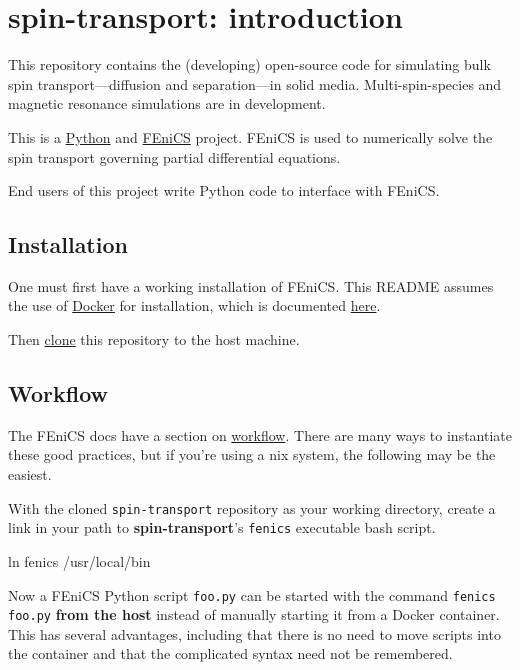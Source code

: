 \documentclass[%
oneside,                 %
final,                   %
10pt]{article}
\begin{document}
\section{spin-transport: introduction}

This repository contains the (developing) open-source code for simulating bulk spin transport---diffusion and separation---in solid media. Multi-spin-species and magnetic resonance simulations are in development.

This is a \href{{https://www.python.org/}}{Python} and \href{{https://fenicsproject.org/}}{FEniCS} project. FEniCS is used to numerically solve the spin transport governing partial differential equations.

End users of this project write Python code to interface with FEniCS.

\subsection{Installation}

One must first have a working installation of FEniCS.
This README assumes the use of \href{{https://www.docker.com/}}{Docker} for installation, which is documented \href{{http://fenics.readthedocs.io/projects/containers/en/latest/}}{here}.

Then \href{{https://help.github.com/articles/cloning-a-repository/}}{clone} this repository to the host machine.

\subsection{Workflow}

The FEniCS docs have a section on \href{{http://fenics.readthedocs.io/projects/containers/en/latest/work_flows.html}}{workflow}.
There are many ways to instantiate these good practices, but if you're using a \*nix system, the following may be the easiest.

With the cloned \texttt{spin-transport} repository as your working directory, create a link in your path to \textbf{spin-transport}'s \texttt{fenics} executable bash script.

\bshcod
ln fenics /usr/local/bin
\eshcod

Now a FEniCS Python script \texttt{foo.py} can be started with the command \texttt{fenics foo.py} \textbf{from the host} instead of manually starting it from a Docker container.
This has several advantages, including that there is no need to move scripts into the container and that the complicated syntax need not be remembered.
\end{document}
